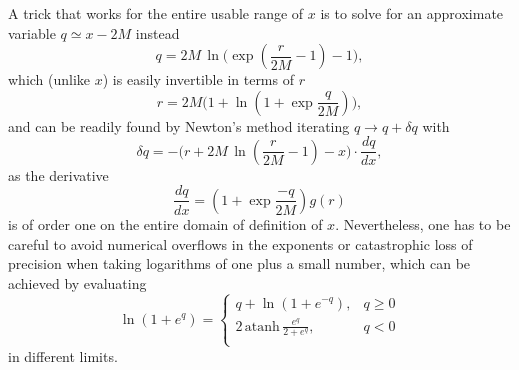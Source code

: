 \documentclass[aps,prd,reprint,twocolumn,groupedaddress]{revtex4-1}
\begin{document}
A trick that works for the entire usable range of $x$ is to solve for an approximate variable $q \simeq x - 2M$ instead \begin{equation}
  q = 2M\, \ln\Bigg(\exp\left(\frac{r}{2M} - 1\right) - 1\Bigg),
\end{equation}
which (unlike $x$) is easily invertible in terms of $r$
\begin{equation}
  r = 2M \Bigg(1 + \ln\left(1+\exp\frac{q}{2M}\right)\Bigg),
\end{equation}
and can be readily found by Newton's method iterating $q \rightarrow q + \delta q$ with
\begin{equation}
  \delta q = -\Bigg(r + 2M\,\ln\left(\frac{r}{2M} - 1\right) - x\Bigg) \cdot \frac{dq}{dx},
\end{equation}
as the derivative
\begin{equation}
  \frac{dq}{dx} = \left(1+\exp\frac{-q}{2M}\right) g(r)
\end{equation}
is of order one on the entire domain of definition of $x$. Nevertheless, one has to be careful to avoid numerical overflows in the exponents or catastrophic loss of precision when taking logarithms of one plus a small number, which can be achieved by evaluating 
\begin{equation}
  \ln\left(1+e^q\right) = \left\{ \begin{array}{rr}
    q + \ln\left(1 + e^{-q}\right),& q \ge 0\\
    2\, \text{atanh}\, {\displaystyle\frac{e^q}{2+e^q}},& q < 0\\
  \end{array} \right.
\end{equation}
in different limits.
\end{document}
